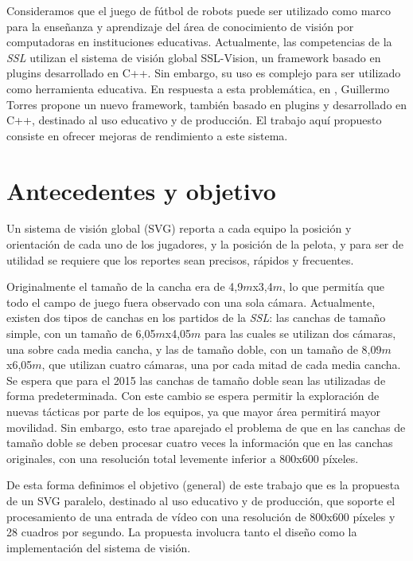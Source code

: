 \documentclass[a4paper]{article}
\begin{document}
Consideramos que el juego de fútbol de robots puede ser utilizado 
como marco para la enseñanza y aprendizaje del área de conocimiento de visión por 
computadoras en instituciones educativas. Actualmente, las competencias de 
la \emph{SSL} utilizan el sistema de visión
global SSL-Vision\cite{sslvision}, un framework basado en plugins
desarrollado en C++. Sin embargo, su uso es complejo para ser utilizado 
como herramienta educativa. En respuesta a esta problemática, en
\cite{torres2014}, Guillermo Torres propone un nuevo framework, también basado en plugins
y desarrollado en C++, destinado al uso educativo y de producción. El trabajo aquí
propuesto consiste en ofrecer mejoras de rendimiento a este sistema.

\section{Antecedentes y objetivo}

Un sistema de visión global (SVG) reporta a cada equipo la
posición y orientación de cada uno de los jugadores, y la posición de la pelota,
y para ser de utilidad se requiere que los reportes sean precisos, rápidos y
frecuentes.

Originalmente el tamaño de la cancha era de 4,9$m$x3,4$m$, lo que permitía que
todo el campo de juego fuera observado con una sola cámara. Actualmente, existen
dos tipos de canchas en los partidos de la \emph{SSL}: las canchas de tamaño
simple, con un tamaño de 6,05$m$x4,05$m$ para las cuales se utilizan dos
cámaras, una sobre cada media cancha, y las de tamaño doble, con un tamaño de
8,09$m$x6,05$m$, que utilizan cuatro cámaras, una por cada mitad de cada media
cancha. Se espera que para el 2015 las canchas de tamaño doble sean las
utilizadas de forma predeterminada. Con este cambio se espera permitir la
exploración de nuevas tácticas por parte de los equipos, ya que mayor área
permitirá mayor movilidad. Sin embargo, esto trae aparejado el problema de que
en las canchas de tamaño doble se deben procesar cuatro veces la información que
en las canchas originales, con una resolución total levemente inferior a 800x600
píxeles.

De esta forma definimos el objetivo (general) de este trabajo que es la
propuesta de un SVG paralelo, destinado al uso educativo y de producción, que
soporte el procesamiento de una entrada de vídeo con una resolución de 800x600
píxeles y 28 cuadros por segundo. La propuesta involucra tanto el diseño como la
implementación del sistema de visión.
\end{document}
